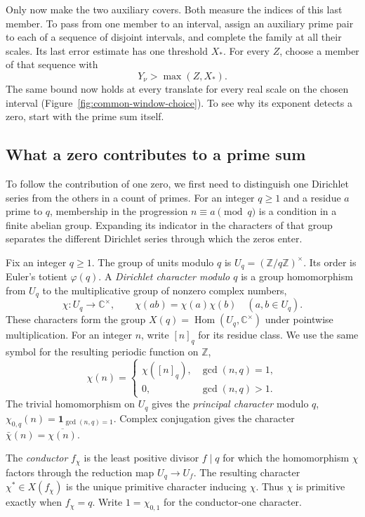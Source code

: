 Only now make the two auxiliary covers. Both measure the indices of this last member. To pass from one member to an interval, assign an auxiliary prime pair to each of a sequence of disjoint intervals, and complete the family at all their scales. Its last error estimate has one threshold \(X_*\). For every \(Z\), choose a member of that sequence with
\[
                       Y_\nu>\max(Z,X_*).
\]
The same bound now holds at every translate for every real scale on the chosen interval (Figure~\ref{fig:common-window-choice}). To see why its exponent detects a zero, start with the prime sum itself.

\subsection{What a zero contributes to a prime sum}

To follow the contribution of one zero, we first need to distinguish one Dirichlet
series from the others in a count of primes. For an integer \(q\ge1\) and a
residue \(a\) prime to \(q\), membership in the progression
\(n\equiv a\pmod q\) is a condition in a finite abelian group.
Expanding its indicator in the characters of that group separates
the different Dirichlet series through which the zeros enter.
\begin{definition}\label{def:dirichlet-modulus}
Fix an integer \(q\ge1\). The group of units modulo \(q\) is
\(U_q=(\mathbb Z/q\mathbb Z)^\times\). Its order is Euler's totient \(\varphi(q)\).
A \emph{Dirichlet character modulo \(q\)} is a group homomorphism
from \(U_q\) to the multiplicative group of nonzero complex numbers,
\[
 \chi:U_q\longrightarrow\mathbb C^\times,\qquad
 \chi(ab)=\chi(a)\chi(b)\quad(a,b\in U_q).
\]
These characters form the group \(X(q)=\operatorname{Hom}(U_q,\mathbb C^\times)\)
under pointwise multiplication. For an integer \(n\), write \([n]_q\) for its
residue class. We use the same symbol for the resulting periodic function on \(\mathbb Z\),
\[
 \chi(n)=
 \begin{cases}
    \chi([n]_q),&\gcd(n,q)=1,\\
    0,&\gcd(n,q)>1.
 \end{cases}
\]
The trivial homomorphism on \(U_q\) gives the \emph{principal character} modulo \(q\),
\(\chi_{0,q}(n)=\mathbf 1_{\gcd(n,q)=1}\).
Complex conjugation gives the character \(\bar\chi(n)=\overline{\chi(n)}\).

The \emph{conductor} \(f_\chi\) is the least positive divisor \(f\mid q\) for which
the homomorphism \(\chi\) factors through the reduction map \(U_q\to U_f\).
The resulting character \(\chi^*\in X(f_\chi)\) is the unique primitive character inducing \(\chi\).
Thus \(\chi\) is primitive exactly when \(f_\chi=q\).
Write \(1=\chi_{0,1}\) for the conductor-one character.
\end{definition}

